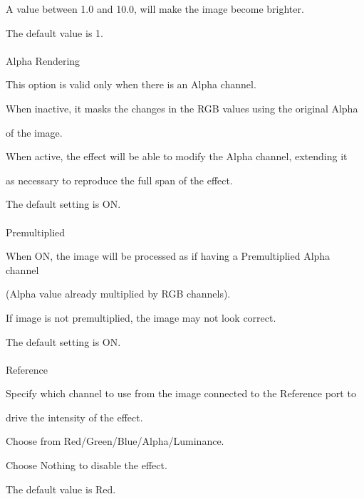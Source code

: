 \documentclass[a4paper,12pt]{article}
\begin{document}
A value between 1.0 and 10.0, will make the image become brighter.\par
The default value is 1.\\
\\
Alpha Rendering\par
This option is valid only when there is an Alpha channel.\par
When inactive, it masks the changes in the RGB values using the original Alpha\par 
of the image.\par
When active, the effect will be able to modify the Alpha channel, extending it\par 
as necessary to reproduce the full span of the effect.\par
The default setting is ON.\\
\\
Premultiplied\par
When ON, the image will be processed as if having a Premultiplied Alpha channel\par 
(Alpha value already multiplied by RGB channels).\par
If image is not premultiplied, the image may not look correct.\par
The default setting is ON.\\
\\
Reference\par
Specify which channel to use from the image connected to the Reference port to\par 
drive the intensity of the effect.\par
Choose from Red/Green/Blue/Alpha/Luminance.\par
Choose Nothing to disable the effect.\par
The default value is \textquotedbl Red\textquotedbl .
\end{document}
